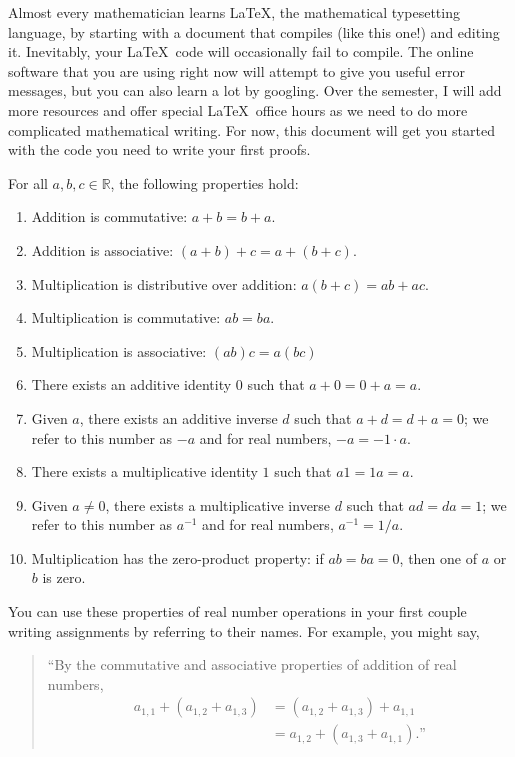 \documentclass{article}
\begin{document}

Almost every mathematician learns \LaTeX, the mathematical typesetting language, by starting with a document that compiles (like this one!) and editing it.  Inevitably, your \LaTeX\ code will occasionally fail to compile.  The online software that you are using right now will attempt to give you useful error messages, but you can also learn a lot by googling.  Over the semester, I will add more resources and offer special \LaTeX\ office hours as we need to do more complicated mathematical writing.  For now, this document will get you started with the code you need to write your first proofs.

\begin{prop*} 
    For all $a,b,c \in \mathbb{R}$, the following properties hold:
    \begin{enumerate}
        \item Addition is commutative: $a+b = b+a$.
        \item Addition is associative: $(a+b)+c = a+(b+c)$.
        \item Multiplication is distributive over addition: $a(b+c) = ab + ac$.
        \item Multiplication is commutative: $ab = ba$.
        \item Multiplication is associative: $(ab)c=a(bc)$
        \item There exists an additive identity $0$ such that $a + 0 = 0 + a = a$.
        \item Given $a$, there exists an additive inverse $d$ such that $a+d = d+a = 0$; we refer to this number as $-a$ and for real numbers, $-a = -1\cdot a$.
        \item There exists a multiplicative identity $1$ such that $a1 = 1a = a$.
        \item Given $a \not = 0$, there exists a multiplicative inverse $d$ such that $ad = da = 1$; we refer to this number as $a^{-1}$ and for real numbers, $a^{-1} = 1/a$.
        \item Multiplication has the zero-product property: if $ab = ba = 0$, then one of $a$ or $b$ is zero.
    \end{enumerate}
\end{prop*}
 
You can use these properties of real number operations in your first couple writing assignments by referring to their names.  For example, you might say, 
\begin{quote}
``By the commutative and associative properties of addition of real numbers, 
\begin{align*}
    a_{1,1} + (a_{1,2} + a_{1,3}) 
        &= (a_{1,2} + a_{1,3}) + a_{1,1}\\ 
        &= a_{1,2} + (a_{1,3} + a_{1,1}).\text{''}
\end{align*}
\end{quote}
\end{document}
